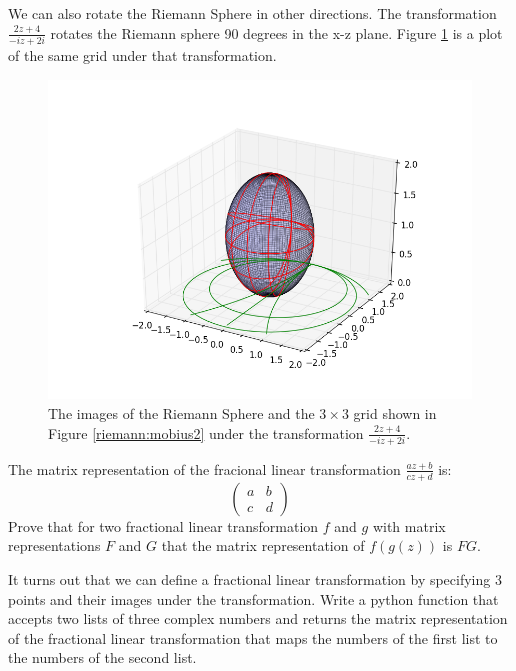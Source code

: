 We can also rotate the Riemann Sphere in other directions.
The transformation $\frac{2z+4}{-iz+2i}$ rotates the Riemann sphere 90 degrees in the x-z plane.
Figure \ref{riemann:mobius5} is a plot of the same grid under that transformation.

\begin{figure}
\includegraphics[width=\textwidth]{mobius5.png}
\caption{The images of the Riemann Sphere and the $3\times 3$ grid shown in Figure \ref{riemann:mobius2} under the transformation $\frac{2z+4}{-iz+2i}$.}
\label{riemann:mobius5}
\end{figure}

\begin{problem}
The matrix representation of the fracional linear transformation $\frac{az+b}{cz+d}$ is:
\[
\begin{pmatrix}
a&b\\
c&d
\end{pmatrix}
\]
Prove that for two fractional linear transformation $f$ and $g$ with matrix representations $F$ and $G$ that the matrix representation of $f(g(z))$ is $FG$.
\end{problem}

\begin{problem}
It turns out that we can define a fractional linear transformation by specifying 3 points and their images under the transformation.
Write a python function that accepts two lists of three complex numbers and returns the matrix representation of the fractional linear transformation that maps the numbers of the first list to the numbers of the second list.
\end{problem}
